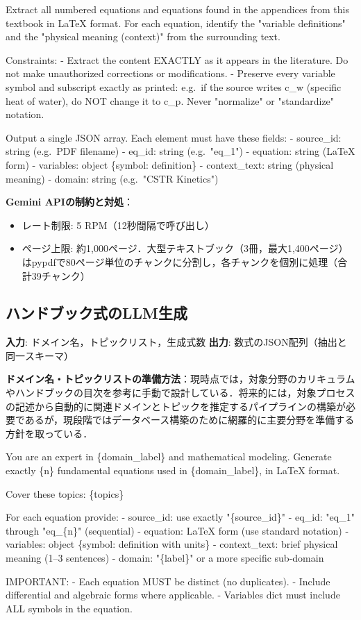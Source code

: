 \documentclass[11pt,a4paper]{ltjsarticle}
\begin{document}
\begin{promptbox}
Extract all numbered equations and equations found in the appendices
from this textbook in LaTeX format. For each equation, identify the
"variable definitions" and the "physical meaning (context)" from the
surrounding text.

Constraints:
- Extract the content EXACTLY as it appears in the literature.
  Do not make unauthorized corrections or modifications.
- Preserve every variable symbol and subscript exactly as printed:
  e.g.\ if the source writes c\_w (specific heat of water),
  do NOT change it to c\_p.
  Never "normalize" or "standardize" notation.

Output a single JSON array. Each element must have these fields:
- source\_id: string (e.g.\ PDF filename)
- eq\_id: string (e.g.\ "eq\_1")
- equation: string (LaTeX form)
- variables: object \{symbol: definition\}
- context\_text: string (physical meaning)
- domain: string (e.g.\ "CSTR Kinetics")
\end{promptbox}

\textbf{Gemini APIの制約と対処}：
\begin{itemize}[nosep]
  \item レート制限: 5 RPM（12秒間隔で呼び出し）
  \item ページ上限: 約1,000ページ．大型テキストブック（3冊，最大1,400ページ）はpypdfで80ページ単位のチャンクに分割し，各チャンクを個別に処理（合計39チャンク）
\end{itemize}

\subsection{ハンドブック式のLLM生成}

\textbf{入力}: ドメイン名，トピックリスト，生成式数 \quad
\textbf{出力}: 数式のJSON配列（抽出と同一スキーマ）

\textbf{ドメイン名・トピックリストの準備方法}：現時点では，対象分野のカリキュラムやハンドブックの目次を参考に手動で設計している．将来的には，対象プロセスの記述から自動的に関連ドメインとトピックを推定するパイプラインの構築が必要であるが，現段階ではデータベース構築のために網羅的に主要分野を準備する方針を取っている．

\begin{promptbox}
You are an expert in \{domain\_label\} and mathematical modeling.
Generate exactly \{n\} fundamental equations used in \{domain\_label\},
in LaTeX format.

Cover these topics: \{topics\}

For each equation provide:
- source\_id: use exactly "\{source\_id\}"
- eq\_id: "eq\_1" through "eq\_\{n\}" (sequential)
- equation: LaTeX form (use standard notation)
- variables: object \{symbol: definition with units\}
- context\_text: brief physical meaning (1--3 sentences)
- domain: "\{label\}" or a more specific sub-domain

IMPORTANT:
- Each equation MUST be distinct (no duplicates).
- Include differential and algebraic forms where applicable.
- Variables dict must include ALL symbols in the equation.
\end{promptbox}
\end{document}
